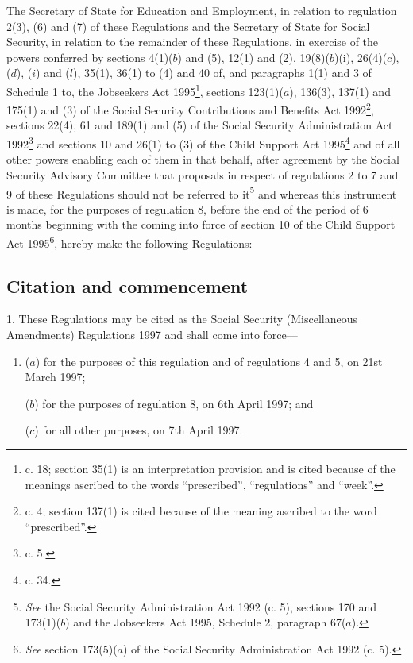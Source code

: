 \documentclass[12pt,a4paper]{article}
\title{\regstitle}
\author{S.I. 1997 No. 454}
\date{Made 24th February 1997\\Laid before Parliament 28th February 1997\\Coming into force \\for the purposes of regulations 1, 4 and 5 21st March 1997\\for the purposes of regulation 8 6th April 1997\\for all other purposes 7th April 1997
}
\begin{document}
\maketitle

\noindent
The Secretary of State for Education and Employment, in relation to regulation 2(3), (6) and (7) of these Regulations and the Secretary of State for Social Security, in relation to the remainder of these Regulations, in exercise of the powers conferred by sections 4(1)($b$)  and (5), 12(1) and (2), 19(8)($b$)(i), 26(4)($c$), ($d$), ($i$) and ($l$), 35(1), 36(1) to (4) and 40 of, and paragraphs 1(1) and 3 of Schedule 1 to, the Jobseekers Act 1995\footnote{ c. 18; section 35(1) is an interpretation provision and is cited because of the meanings ascribed to the words “prescribed”, “regulations” and “week”.}, sections 123(1)($a$), 136(3), 137(1) and 175(1) and (3) of the Social Security Contributions and Benefits Act 1992\footnote{ c. 4; section 137(1) is cited because of the meaning ascribed to the word “prescribed”.}, sections 22(4), 61 and 189(1) and (5) of the Social Security Administration Act 1992\footnote{ c. 5.} and sections 10 and 26(1) to (3) of the Child Support Act 1995\footnote{ c. 34.} and of all other powers enabling each of them in that behalf, after agreement by the Social Security Advisory Committee that proposals in respect of regulations 2 to 7 and 9 of these Regulations should not be referred to it\footnote{\frenchspacing \emph{See} the Social Security Administration Act 1992 (c. 5), sections 170 and 173(1)($b$) and the Jobseekers Act 1995, Schedule 2, paragraph 67($a$).} and whereas this instrument is made, for the purposes of regulation 8, before the end of the period of 6 months beginning with the coming into force of section 10 of the Child Support Act 1995\footnote{\frenchspacing \emph{See} section 173(5)($a$) of the Social Security Administration Act 1992 (c. 5).}, hereby make the following Regulations: 


{\sloppy

\tableofcontents

}

\setcounter{secnumdepth}{-2}

\subsection[1. Citation and commencement]{Citation and commencement}

1.  These Regulations may be cited as the Social Security (Miscellaneous Amendments) Regulations 1997 and shall come into force—
\begin{enumerate}\item[]
($a$) for the purposes of this regulation and of regulations 4 and 5, on 21st March 1997;

($b$) for the purposes of regulation 8, on 6th April 1997; and

($c$) for all other purposes, on 7th April 1997.
\end{enumerate}
\end{document}
